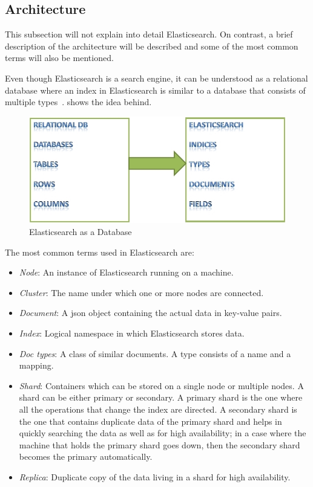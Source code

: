 \subsection{Architecture}
This subsection will not explain into detail Elasticsearch. On contrast, a brief description of the architecture will be described and some of the most common terms will also be mentioned.\par
Even though Elasticsearch is a search engine, it can be understood as a relational database where an index in Elasticsearch is similar to a database that consists of multiple types~\cite{elastic2}.  shows the idea behind.
\begin{figure}
  \includegraphics[width=\linewidth]{img/elastic_1.png}
  \caption{Elasticsearch as a Database~\cite{elastic2}}
  \label{fig:elastic1}
\end{figure}
The most common terms used in Elasticsearch are:
\begin{itemize}
    \item \textit{Node}: An instance of Elasticsearch running on a machine.
    \item \textit{Cluster}: The name under which one or more nodes are connected.
    \item \textit{Document}: A \ac{json} object containing the actual data in key-value pairs.
    \item \textit{Index}: Logical namespace in which Elasticsearch stores data.
    \item \textit{Doc types}: A class of similar documents. A type consists of a name and a mapping.
    \item \textit{Shard}: Containers which can be stored on a single node or multiple nodes. A  shard can be either primary or secondary. A primary shard is the one where all the operations that change the index are directed. A secondary shard is the one that contains duplicate data of the primary shard and helps in quickly searching the data as well as for high availability; in a case where the machine that holds the primary shard goes down, then the secondary shard becomes the primary automatically.
    \item \textit{Replica}: Duplicate copy of the data living in a shard for high availability.
\end{itemize}





